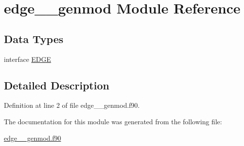 \hypertarget{classedge____genmod}{\section{edge\+\_\+\+\_\+genmod Module Reference}
\label{classedge____genmod}
}
\subsection*{Data Types}
\begin{DoxyCompactItemize}
\item 
interface \hyperlink{interfaceedge____genmod_1_1EDGE}{E\+D\+G\+E}
\end{DoxyCompactItemize}


\subsection{Detailed Description}


Definition at line 2 of file edge\+\_\+\+\_\+genmod.\+f90.



The documentation for this module was generated from the following file\+:\begin{DoxyCompactItemize}
\item 
\hyperlink{edge____genmod_8f90}{edge\+\_\+\+\_\+genmod.\+f90}\end{DoxyCompactItemize}
